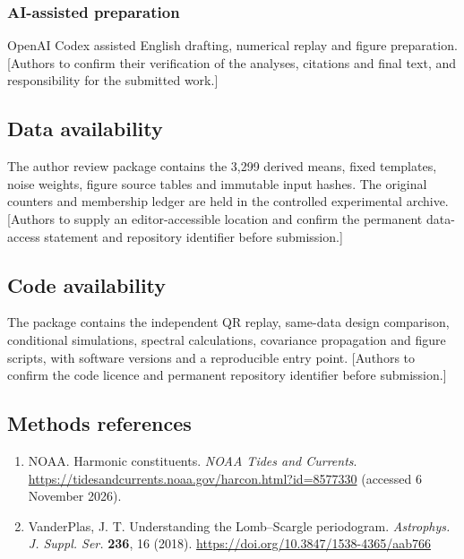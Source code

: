 \documentclass[
  12pt,
  a4paper,
]{article}
\providecommand{\tightlist}{%
  \setlength{\itemsep}{0pt}\setlength{\parskip}{0pt}}
\begin{document}
\hypertarget{ai-assisted-preparation}{%
\subsubsection{AI-assisted preparation}\label{ai-assisted-preparation}}

OpenAI Codex assisted English drafting, numerical replay and figure
preparation. {[}Authors to confirm their verification of the analyses,
citations and final text, and responsibility for the submitted work.{]}

\singlespacing\fontsize{11}{13}\selectfont

\hypertarget{data-availability}{%
\subsection{Data availability}\label{data-availability}}

The author review package contains the 3,299 derived means, fixed
templates, noise weights, figure source tables and immutable input
hashes. The original counters and membership ledger are held in the
controlled experimental archive. {[}Authors to supply an
editor-accessible location and confirm the permanent data-access
statement and repository identifier before submission.{]}

\singlespacing\fontsize{11}{13}\selectfont

\hypertarget{code-availability}{%
\subsection{Code availability}\label{code-availability}}

The package contains the independent QR replay, same-data design
comparison, conditional simulations, spectral calculations, covariance
propagation and figure scripts, with software versions and a
reproducible entry point. {[}Authors to confirm the code licence and
permanent repository identifier before submission.{]}

\singlespacing\fontsize{11}{13}\selectfont

\hypertarget{methods-references}{%
\subsection{Methods references}\label{methods-references}}

\begin{enumerate}
\def\labelenumi{\arabic{enumi}.}
\setcounter{enumi}{22}
\tightlist
\item
  NOAA. Harmonic constituents. \emph{NOAA Tides and Currents}.
  \url{https://tidesandcurrents.noaa.gov/harcon.html?id=8577330}
  (accessed 6 November 2026).
\item
  VanderPlas, J. T. Understanding the Lomb--Scargle periodogram.
  \emph{Astrophys. J. Suppl. Ser.} \textbf{236}, 16 (2018).
  \url{https://doi.org/10.3847/1538-4365/aab766}
\end{enumerate}
\end{document}
